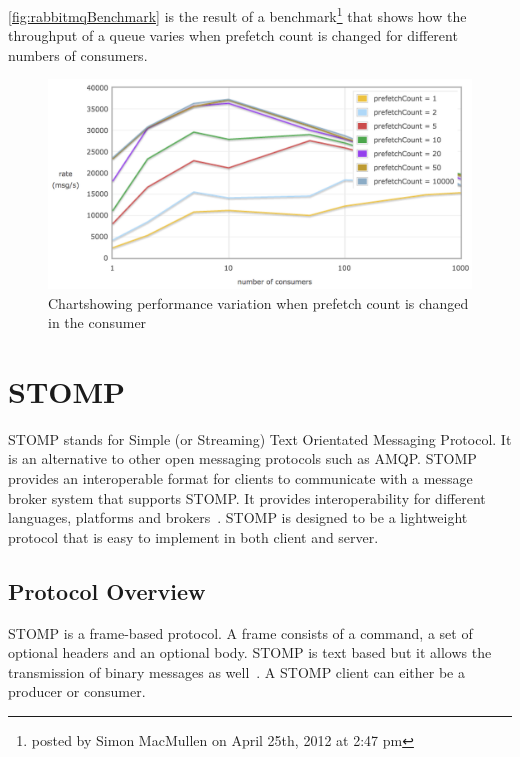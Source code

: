   \autoref{fig:rabbitmqBenchmark} is the result of a benchmark\footnote{posted by Simon MacMullen on April 25th, 2012 at 2:47 pm} that shows how the throughput of a queue varies when prefetch count is changed for different numbers of consumers.
\begin{figure}[H]
  \centering
  \includegraphics[width=1\textwidth]{figures/rabbitmqPrefetch}
  \caption[Chart showing performance variation when prefetch count is changed in the consumer]{Chart\footnotemark showing performance variation when prefetch count is changed in the consumer}
  \label{fig:rabbitmqBenchmark}
\end{figure}

\section{STOMP}
\label{sec:stomp}
  STOMP stands for Simple (or Streaming) Text Orientated Messaging Protocol. It is an alternative to other open messaging protocols such as AMQP. STOMP provides an interoperable format for clients to communicate with a message broker system that supports STOMP. It provides interoperability for different languages, platforms and brokers~\cite{stomp}.
  STOMP is designed to be a lightweight protocol that is easy to implement in both client and server.
  \subsection{Protocol Overview}
  STOMP is a frame-based protocol. A frame consists of a command, a set of optional headers and an optional body. STOMP is text based but it allows the transmission of binary messages as well~\cite{stomp}. A STOMP client can either be a producer or consumer.

